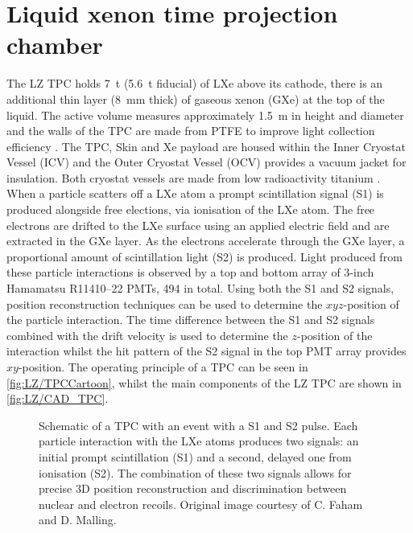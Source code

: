\section{Liquid xenon time projection chamber}\label{sec:LZ/LXeTPC}
The LZ TPC holds 7~t (5.6~t fiducial) of LXe above its cathode, there is an additional thin layer (8~mm thick) of gaseous xenon (GXe) at the top of the liquid. The active volume measures approximately 1.5~m in height and diameter and the walls of the TPC are made from PTFE to improve light collection efficiency \cite{LZNIMA}. The TPC, Skin and Xe payload are housed within the Inner Cryostat Vessel (ICV) and the Outer Cryostat Vessel (OCV) provides a vacuum jacket for insulation. Both cryostat vessels are made from low radioactivity titanium \cite{LZ:2017iwn}. When a particle scatters off a LXe atom a prompt scintillation signal (S1) is produced alongside free elections, via ionisation of the LXe atom. The free electrons are drifted to the LXe surface using an applied electric field and are extracted in the GXe layer. As the electrons accelerate through the GXe layer, a proportional amount of scintillation light (S2) is produced. Light produced from these particle interactions is observed by a top and bottom array of 3-inch Hamamatsu R11410–22 PMTs, 494 in total. Using both the S1 and S2 signals, position reconstruction techniques can be used to determine the $xyz$-position of the particle interaction. The time difference between the S1 and S2 signals combined with the drift velocity is used to determine the $z$-position of the interaction whilst the hit pattern of the S2 signal in the top PMT array provides $xy$-position. The operating principle of a TPC can be seen in \autoref{fig:LZ/TPCCartoon}, whilst the main components of the LZ TPC are shown in \autoref{fig:LZ/CAD_TPC}.
\begin{figure}[!ht]
    \centering
    
    \caption{Schematic of a TPC with an event with a S1 and S2 pulse. Each particle interaction with the LXe atoms produces two signals: an initial prompt scintillation (S1) and a second, delayed one from ionisation (S2). The combination of these two signals allows for precise 3D position reconstruction and discrimination between nuclear and electron recoils. Original image courtesy of C. Faham and D. Malling.}
    \label{fig:LZ/TPCCartoon}
\end{figure}

